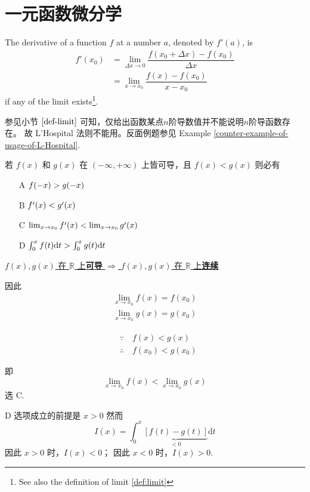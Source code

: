 \twocolumn
\chapter{一元函数微分学}

\begin{definition}
    \label{def:single-order-derivative}
    The derivative of a function $f$ at a number $a$, denoted by $f'(a)$, is 
    \begin{align}
        f'(x_0) &= \lim_{\Delta x \to 0} \dfrac{f(x_0+\Delta x) - f(x_0)}{\Delta x} \\
                &= \lim_{x \to x_0} \dfrac{f(x) - f(x_0)}{x - x_0}
    \end{align}
    if any of the limit exists\footnote{See also the definition of limit \ref{def:limit}}.
\end{definition}
参见小节 $\ref{def-limit}$ 可知，仅给出函数某点$n$阶导数值并不能说明$n$阶导函数存在。
故 L'Hospital 法则不能用。反面例题参见 Example \ref{counter-example-of-usage-of-L-Hospital}.

\begin{example} 
    若 $f(x)$ 和 $g(x)$ 在 $(-\infty, +\infty)$ 上皆可导，且
    $f(x) < g(x)$ 则必有
    \begin{enumerate}
        \item[A] $\cramped{f(-x) > g(-x)}$ 
        \item[B] $\cramped{f'(x) < g'(x)}$ 
        \item[C] $\cramped{\lim_{x \to x_0}f'(x) < \lim_{x \to x_0}g'(x)}$ 
        \item[D] $\cramped{\int_0^x f(t) \mathrm dt > \int_0^x g(t) \mathrm dt}$ 
    \end{enumerate}

    \uline{
        $f(x), g(x)$ 在 $\mathbb R$ 上\textbf{可导} $\Rightarrow$ 
        $f(x), g(x)$ 在 $\mathbb R$ 上\textbf{连续}
    }

    因此
    \begin{gather*}
        \lim_{x \to x_0} f(x) = f(x_0) \\
        \lim_{x \to x_0} g(x) = g(x_0) 
    \end{gather*}

    \begin{align*}
        &\because \quad f(x) < g(x) \\
        &\therefore \quad f(x_0) < g(x_0) 
    \end{align*}

    即
    \[
        \lim_{x \to x_0} f(x) < \lim_{x \to x_0} g(x) 
    \]
    选 C.

    D 选项成立的前提是 $x > 0$ 然而 
    \[
        I(x) = \int_0^x \underbrace{\left[f(t) - g(t)\right]}_{< 0} \mathrm dt
    \]
    因此 $x > 0$ 时，$I(x) < 0$；
    因此 $x < 0$ 时，$I(x) > 0$.
\end{example}

